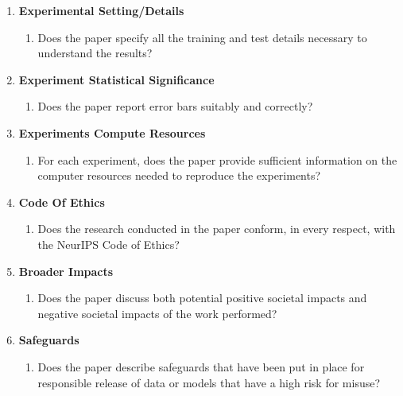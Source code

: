 \documentclass{article}
\begin{document}
\begin{enumerate}
\item {\bf Experimental Setting/Details}
    \begin{enumerate}
        \item Does the paper specify all the training and test details necessary to understand the results? 
    \end{enumerate}

\item {\bf Experiment Statistical Significance}
    \begin{enumerate}
        \item Does the paper report error bars suitably and correctly? 
    \end{enumerate}

\item {\bf Experiments Compute Resources}
    \begin{enumerate}
        \item For each experiment, does the paper provide sufficient information on the computer resources needed to reproduce the experiments? 
    \end{enumerate}

\item {\bf Code Of Ethics}
    \begin{enumerate}
        \item Does the research conducted in the paper conform, in every respect, with the NeurIPS Code of Ethics? \answerYes{}
    \end{enumerate}

\item {\bf Broader Impacts}
    \begin{enumerate}
        \item Does the paper discuss both potential positive societal impacts and negative societal impacts of the work performed? 
    \end{enumerate}

\item {\bf Safeguards}
    \begin{enumerate}
        \item Does the paper describe safeguards that have been put in place for responsible release of data or models that have a high risk for misuse? 
    \end{enumerate}


\end{enumerate}
\end{document}
